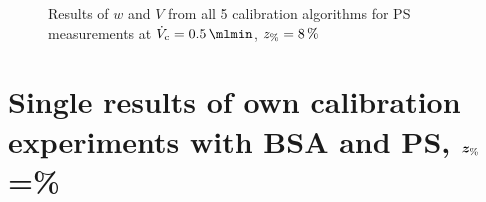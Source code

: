 \begin{figure}[!hb]
\begin{center}
\begin{subfigure}{\subFigSize}
    \end{subfigure}
  \end{center}
  \vspace*{-4ex}    
  \caption[Results of $w$ and $V$ from all 5 calibration algorithms for PS measurements at
  $\Vc = \SI{0.5}{\mlmin}$, $\zP = \SI{8}{\percent}$]{
    Results of $w$ and $V$ from all 5 calibration algorithms for PS measurements at
    $\Vc = \SI{0.5}{\mlmin}$, $\zP = \SI{8}{\percent}$
  }
  \label{fig:calibRes_PS_VC0_5_p8}
\end{figure}
\section*{Single results of own calibration experiments with BSA and PS, 
$\bm{z_\text{\%}}$\thinspace=\thinspace\%}
\renewcommand{\subFigSize}{0.49\linewidth}
